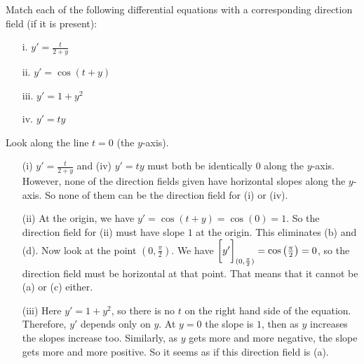 \documentclass[]{ximera}
\begin{document}
\begin{problem}
Match each of the following differential equations with a corresponding direction field (if it is present):
	\begin{multicols}{2}
	\begin{enumerate}
	\item[i.]	$y' = \frac{t}{2+y}$
	\item[ii.]	$y' = \cos(t+y)$
	\item[iii.]	$y' = 1+y^2$
	\item[iv.]	$y' = ty$
	\end{enumerate}
	\end{multicols}
	
	
	\begin{freeResponse}
	Look along the line $t=0$ (the $y$-axis).
	\begin{enumerate}
	
	\item[(i)] $y' = \frac{t}{2+y}$ and (iv) $y'=ty$ must both be identically $0$ along the $y$-axis.  
	However, none of the direction fields given have horizontal slopes along the $y$-axis.  
	So none of them can be the direction field for (i) or (iv).  
	
	\item[(ii)]  At the origin, we have $y' = \cos(t+y) = \cos(0) = 1$.  
	So the direction field for (ii) must have slope $1$ at the origin.  
	This eliminates (b) and (d).  
	Now look at the point $\left( 0, \frac{\pi}{2} \right)$.  
	We have $\bigg[ y' \bigg]_{(0,\frac{\pi}{2})} = \cos \left( \frac{\pi}{2} \right) = 0$, so the direction field must be horizontal at that point.  
	That means that it cannot be (a) or (c) either.
	
	\item[(iii)]  Here $y' = 1+y^2$, so there is no $t$ on the right hand side of the equation.  
	Therefore, $y'$ depends only on $y$.  
	At $y=0$ the slope is $1$, then as $y$ increases the slopes increase too.  
	Similarly, as $y$ gets more and more negative, the slope gets more and more positive.  
	So it seems as if this direction field is (a).
	
	\end{enumerate}
	\end{freeResponse}

\end{problem}
\end{document}
